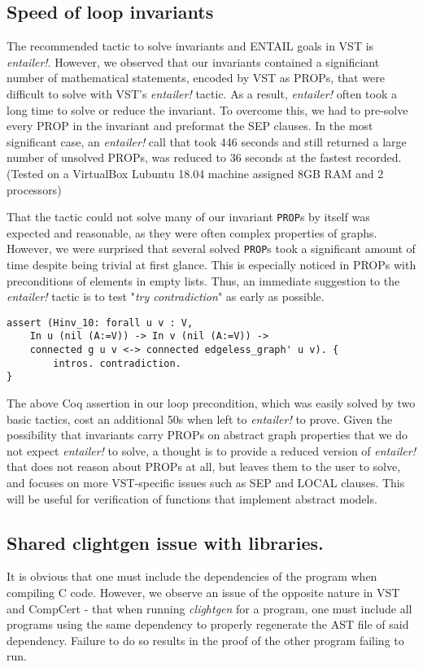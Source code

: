 \subsection{Speed of loop invariants}
The recommended tactic to solve invariants and ENTAIL goals in VST is \textit{entailer!}. However, we observed that our invariants contained a significiant number of mathematical statements, encoded by VST as PROPs, that were difficult to solve with VST's \textit{entailer!} tactic. As a result, \textit{entailer!} often took a long time to solve or reduce the invariant. To overcome this, we had to pre-solve every PROP in the invariant and preformat the SEP clauses. In the most significant case, an \textit{entailer!} call that took 446 seconds and still returned a large number of unsolved PROPs, was reduced to 36 seconds at the fastest recorded. (Tested on a VirtualBox Lubuntu 18.04 machine assigned 8GB RAM and 2 processors)

That the tactic could not solve many of our invariant \texttt{PROP}s by itself was expected and reasonable, as they were often complex properties of graphs. However, we were surprised that several solved \texttt{PROP}s took a significant amount of time despite being trivial at first glance. This is especially noticed in PROPs with preconditions of elements in empty lists. Thus, an immediate suggestion to the \textit{entailer!} tactic is to test "\textit{try contradiction}" as early as possible.
\begin{lstlisting}
assert (Hinv_10: forall u v : V,
	In u (nil (A:=V)) -> In v (nil (A:=V)) ->
	connected g u v <-> connected edgeless_graph' u v). {
		intros. contradiction.
}
\end{lstlisting}
The above Coq assertion in our loop precondition, which was easily solved by two basic tactics, cost an additional 50s when left to \textit{entailer!} to prove.
\newline\newline
Given the possibility that invariants carry PROPs on abstract graph properties that we do not expect \textit{entailer!} to solve, a thought is to provide a reduced version of \textit{entailer!} that does not reason about PROPs at all, but leaves them to the user to solve, and focuses on more VST-specific issues such as SEP and LOCAL clauses. This will be useful for verification of functions that implement abstract models.

\subsection{Shared clightgen issue with libraries.} It is obvious that one must include the dependencies of the program when compiling C code. However, we observe an issue of the opposite nature in VST and CompCert - that when running \textit{clightgen} for a program, one must include all programs using the same dependency to properly regenerate the AST file of said dependency. Failure to do so results in the proof of the other program failing to run.

